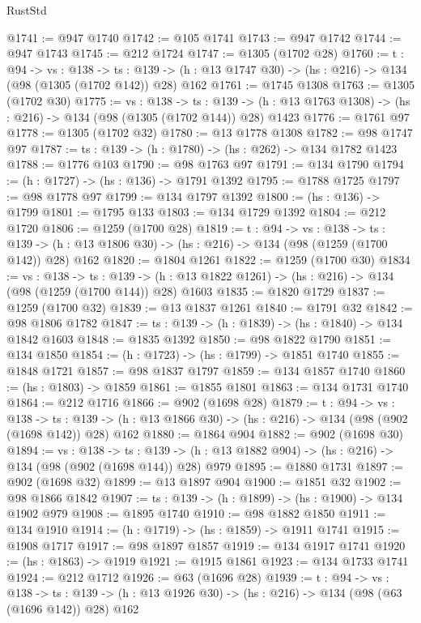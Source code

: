 \begin{lexlean}{RustStd}
\begin{coremodule}
{\begin{coremodule}
{{{{{{{{{@1741 := @947 @1740
@1742 := @105 @1741
@1743 := @947 @1742
@1744 := @947 @1743
@1745 := @212 @1724
@1747 := @1305 (@1702 @28)
@1760 := {t : @94} ->
  {vs : @138} ->
  {ts : @139} -> (h : @13 @1747 @30) -> (hs : @216) -> @134 (@98 (@1305 (@1702 @142)) @28) @162
@1761 := @1745 @1308
@1763 := @1305 (@1702 @30)
@1775 := {vs : @138} ->
  {ts : @139} -> (h : @13 @1763 @1308) -> (hs : @216) -> @134 (@98 (@1305 (@1702 @144)) @28) @1423
@1776 := @1761 @97
@1778 := @1305 (@1702 @32)
@1780 := @13 @1778 @1308
@1782 := @98 @1747 @97
@1787 := {ts : @139} -> (h : @1780) -> (hs : @262) -> @134 @1782 @1423
@1788 := @1776 @103
@1790 := @98 @1763 @97
@1791 := @134 @1790
@1794 := (h : @1727) -> (hs : @136) -> @1791 @1392
@1795 := @1788 @1725
@1797 := @98 @1778 @97
@1799 := @134 @1797 @1392
@1800 := (hs : @136) -> @1799
@1801 := @1795 @133
@1803 := @134 @1729 @1392
@1804 := @212 @1720
@1806 := @1259 (@1700 @28)
@1819 := {t : @94} ->
  {vs : @138} ->
  {ts : @139} -> (h : @13 @1806 @30) -> (hs : @216) -> @134 (@98 (@1259 (@1700 @142)) @28) @162
@1820 := @1804 @1261
@1822 := @1259 (@1700 @30)
@1834 := {vs : @138} ->
  {ts : @139} -> (h : @13 @1822 @1261) -> (hs : @216) -> @134 (@98 (@1259 (@1700 @144)) @28) @1603
@1835 := @1820 @1729
@1837 := @1259 (@1700 @32)
@1839 := @13 @1837 @1261
@1840 := @1791 @32
@1842 := @98 @1806 @1782
@1847 := {ts : @139} -> (h : @1839) -> (hs : @1840) -> @134 @1842 @1603
@1848 := @1835 @1392
@1850 := @98 @1822 @1790
@1851 := @134 @1850
@1854 := (h : @1723) -> (hs : @1799) -> @1851 @1740
@1855 := @1848 @1721
@1857 := @98 @1837 @1797
@1859 := @134 @1857 @1740
@1860 := (hs : @1803) -> @1859
@1861 := @1855 @1801
@1863 := @134 @1731 @1740
@1864 := @212 @1716
@1866 := @902 (@1698 @28)
@1879 := {t : @94} ->
  {vs : @138} ->
  {ts : @139} -> (h : @13 @1866 @30) -> (hs : @216) -> @134 (@98 (@902 (@1698 @142)) @28) @162
@1880 := @1864 @904
@1882 := @902 (@1698 @30)
@1894 := {vs : @138} ->
  {ts : @139} -> (h : @13 @1882 @904) -> (hs : @216) -> @134 (@98 (@902 (@1698 @144)) @28) @979
@1895 := @1880 @1731
@1897 := @902 (@1698 @32)
@1899 := @13 @1897 @904
@1900 := @1851 @32
@1902 := @98 @1866 @1842
@1907 := {ts : @139} -> (h : @1899) -> (hs : @1900) -> @134 @1902 @979
@1908 := @1895 @1740
@1910 := @98 @1882 @1850
@1911 := @134 @1910
@1914 := (h : @1719) -> (hs : @1859) -> @1911 @1741
@1915 := @1908 @1717
@1917 := @98 @1897 @1857
@1919 := @134 @1917 @1741
@1920 := (hs : @1863) -> @1919
@1921 := @1915 @1861
@1923 := @134 @1733 @1741
@1924 := @212 @1712
@1926 := @63 (@1696 @28)
@1939 := {t : @94} ->
  {vs : @138} ->
  {ts : @139} -> (h : @13 @1926 @30) -> (hs : @216) -> @134 (@98 (@63 (@1696 @142)) @28) @162
}}}}}}}}}
\end{coremodule}}
\end{coremodule}
\end{lexlean}
